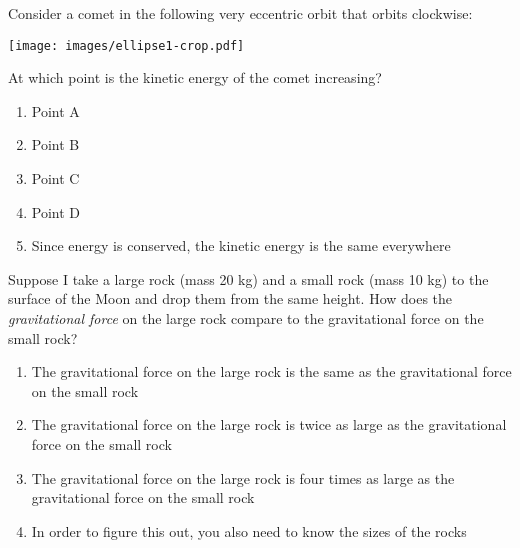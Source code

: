 \documentclass[12pt]{article}
\def\BS{\bigskip}
\newcommand{\BC}{\begin{center}}
\newcommand{\EC}{\end{center}}
\begin{document}
\newpage
\normalsize
\begin{enumerate}
\begin{minipage}{\textwidth}
\item{Consider a comet in the following very eccentric orbit that orbits clockwise:

\BS
\BC
\texttt{[image: images/ellipse1-crop.pdf]}
\EC
\BS

At which point is the kinetic energy of the comet increasing?

\begin{enumerate}[label=(\Alph*)]
\setlength\itemsep{0.0em}
\item{ Point A }
\item{ Point B }
\item{ Point C }
\item{ Point D }
\item{ Since energy is conserved, the kinetic energy is the same everywhere }
\end{enumerate}
} %
\end{minipage}


\vspace{0.5in}

\begin{minipage}{\textwidth}
\item{Suppose I take a large rock (mass 20 kg) and a small rock (mass 10 kg) to the surface of the Moon and drop them from the same height.
How does the {\it gravitational force} on the large rock compare to the gravitational force on the small rock?

\begin{enumerate}[label=(\Alph*)]
\setlength\itemsep{0.0em}
\item{ The gravitational force on the large rock is the same as the gravitational force on the small rock }
\item{ The gravitational force on the large rock is twice as large as the gravitational force on the small rock }
\item{ The gravitational force on the large rock is four times as large as the gravitational force on the small rock }
\item{ In order to figure this out, you also need to know the sizes of the rocks }
\end{enumerate}
} %
\end{minipage}



\end{enumerate}
\end{document}
